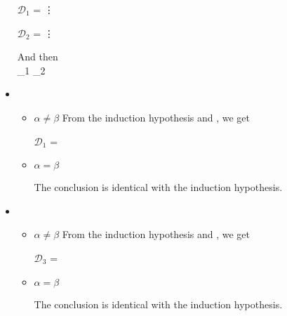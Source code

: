\begin{itemize}
	      $\mathcal{D}_1$ = 
	      {\vdots}
	      	      
	      $\mathcal{D}_2$ = 
	      {\vdots}
	      	      
	      And then \\
	      {_1 \andalso {}_2}
	      	      
	\item \TTB
	      	      
	      \begin{itemize}
	      		      	
	      	\item $\alpha \neq \beta$
	      	      From the induction hypothesis and \TTB, we get
	      	      	      	      
	      	      $\mathcal{D}_1$ = 
	      	      {}
	      	      	      	      
	      	\item $\alpha = \beta$
	      	      	      	      
	      	      The conclusion is identical with the induction hypothesis.
	      	      	      	      
	      \end{itemize}
	      	      
	\item \TTBL
	      	      
	      \begin{itemize}
	      		      	
	      	\item $\alpha \neq \beta$
	      	      From the induction hypothesis and \TTBL, we get
	      	      	      	      
	      	      $\mathcal{D}_3$ = 
	      	      {
	      	      }
	      	      	      	      
	      	\item $\alpha = \beta$
	      	      	      	      
	      	      The conclusion is identical with the induction hypothesis.
	      	      	      	      
	      \end{itemize}
	      	      

\end{itemize}
